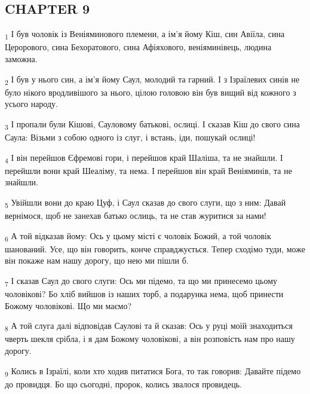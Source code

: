 \subsection{CHAPTER 9}
\begin{tcolorbox}
\textsubscript{1} І був чоловік із Веніяминового племени, а ім'я йому Кіш, син Авіїла, сина Церорового, сина Бехоратового, сина Афіяхового, веніяминівець, людина заможна.
\end{tcolorbox}
\begin{tcolorbox}
\textsubscript{2} І був у нього син, а ім'я йому Саул, молодий та гарний. І з Ізраїлевих синів не було нікого вродливішого за нього, цілою головою він був вищий від кожного з усього народу.
\end{tcolorbox}
\begin{tcolorbox}
\textsubscript{3} І пропали були Кішові, Сауловому батькові, ослиці. І сказав Кіш до свого сина Саула: Візьми з собою одного із слуг, і встань, іди, пошукай ослиці!
\end{tcolorbox}
\begin{tcolorbox}
\textsubscript{4} І він перейшов Єфремові гори, і перейшов край Шаліша, та не знайшли. І перейшли вони край Шеаліму, та нема. І перейшов він край Веніяминів, та не знайшли.
\end{tcolorbox}
\begin{tcolorbox}
\textsubscript{5} Увійшли вони до краю Цуф, і Саул сказав до свого слуги, що з ним: Давай вернімося, щоб не занехав батько ослиць, та не став журитися за нами!
\end{tcolorbox}
\begin{tcolorbox}
\textsubscript{6} А той відказав йому: Ось у цьому місті є чоловік Божий, а той чоловік шанований. Усе, що він говорить, конче справджується. Тепер сходімо туди, може він покаже нам нашу дорогу, що нею ми пішли б.
\end{tcolorbox}
\begin{tcolorbox}
\textsubscript{7} І сказав Саул до свого слуги: Ось ми підемо, та що ми принесемо цьому чоловікові? Бо хліб вийшов із наших торб, а подарунка нема, щоб принести Божому чоловікові. Що ми маємо?
\end{tcolorbox}
\begin{tcolorbox}
\textsubscript{8} А той слуга далі відповідав Саулові та й сказав: Ось у руці моїй знаходиться чверть шекля срібла, і я дам Божому чоловікові, а він розповість нам про нашу дорогу.
\end{tcolorbox}
\begin{tcolorbox}
\textsubscript{9} Колись в Ізраїлі, коли хто ходив питатися Бога, то так говорив: Давайте підемо до провидця. Бо що сьогодні, пророк, колись звалося провидець.
\end{tcolorbox}
